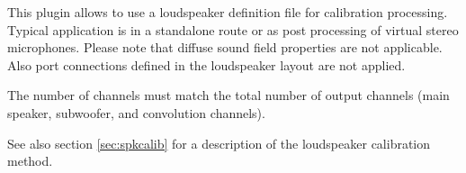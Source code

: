 This plugin allows to use a loudspeaker definition file for
calibration processing. Typical application is in a standalone route
or as post processing of virtual stereo microphones. Please note that
diffuse sound field properties are not applicable. Also port
connections defined in the loudspeaker layout are not applied.

The number of channels must match the total number of output channels
(main speaker, subwoofer, and convolution channels).

See also section \ref{sec:spkcalib} for a description of the
loudspeaker calibration method.



